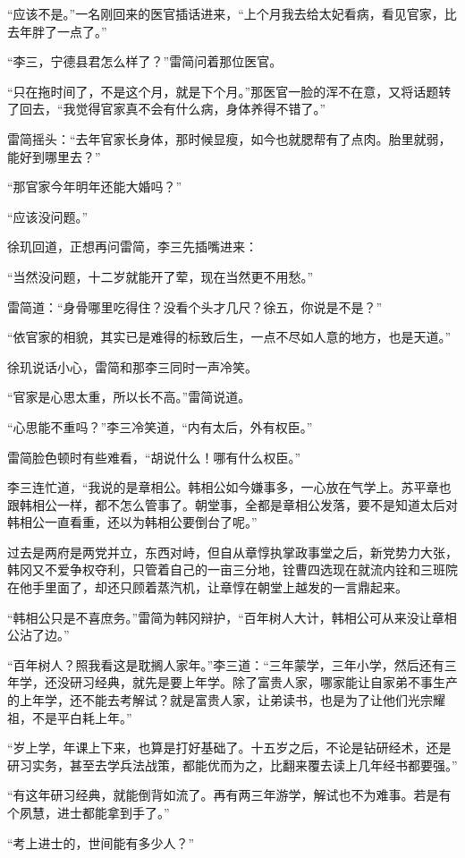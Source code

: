 “应该不是。”一名刚回来的医官插话进来，“上个月我去给太妃看病，看见官家，比去年胖了一点了。”

“李三，宁德县君怎么样了？”雷简问着那位医官。

“只在拖时间了，不是这个月，就是下个月。”那医官一脸的浑不在意，又将话题转了回去，“我觉得官家真不会有什么病，身体养得不错了。”

雷简摇头：“去年官家长身体，那时候显瘦，如今也就腮帮有了点肉。胎里就弱，能好到哪里去？”

“那官家今年明年还能大婚吗？”

“应该没问题。”

徐玑回道，正想再问雷简，李三先插嘴进来：

“当然没问题，十二岁就能开了荤，现在当然更不用愁。”

雷简道：“身骨哪里吃得住？没看个头才几尺？徐五，你说是不是？”

“依官家的相貌，其实已是难得的标致后生，一点不尽如人意的地方，也是天道。”

徐玑说话小心，雷简和那李三同时一声冷笑。

“官家是心思太重，所以长不高。”雷简说道。

“心思能不重吗？”李三冷笑道，“内有太后，外有权臣。”

雷简脸色顿时有些难看，“胡说什么！哪有什么权臣。”

李三连忙道，“我说的是章相公。韩相公如今嫌事多，一心放在气学上。苏平章也跟韩相公一样，都不怎么管事了。朝堂事，全都是章相公发落，要不是知道太后对韩相公一直看重，还以为韩相公要倒台了呢。”

过去是两府是两党并立，东西对峙，但自从章惇执掌政事堂之后，新党势力大张，韩冈又不爱争权夺利，只管着自己的一亩三分地，铨曹四选现在就流内铨和三班院在他手里面了，却还只顾着蒸汽机，让章惇在朝堂上越发的一言鼎起来。

“韩相公只是不喜庶务。”雷简为韩冈辩护，“百年树人大计，韩相公可从来没让章相公沾了边。”

“百年树人？照我看这是耽搁人家年。”李三道：“三年蒙学，三年小学，然后还有三年学，还没研习经典，就先是要上年学。除了富贵人家，哪家能让自家弟不事生产的上年学，还不能去考解试？就是富贵人家，让弟读书，也是为了让他们光宗耀祖，不是平白耗上年。”

“岁上学，年课上下来，也算是打好基础了。十五岁之后，不论是钻研经术，还是研习实务，甚至去学兵法战策，都能优而为之，比翻来覆去读上几年经书都要强。”

“有这年研习经典，就能倒背如流了。再有两三年游学，解试也不为难事。若是有个夙慧，进士都能拿到手了。”

“考上进士的，世间能有多少人？”

